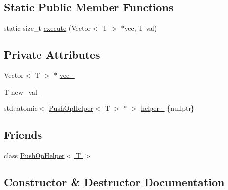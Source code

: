 \subsection*{Static Public Member Functions}
\begin{DoxyCompactItemize}
\item 
static size\+\_\+t \hyperlink{classtervel_1_1containers_1_1wf_1_1vector_1_1_push_op_adb5e668f536428dbda367da3dee6a94d}{execute} (Vector$<$ T $>$ $\ast$vec, T val)
\end{DoxyCompactItemize}
\subsection*{Private Attributes}
\begin{DoxyCompactItemize}
\item 
Vector$<$ T $>$ $\ast$ \hyperlink{classtervel_1_1containers_1_1wf_1_1vector_1_1_push_op_ace670d6d64e1f884f6213135d32d6dbe}{vec\+\_\+}
\item 
T \hyperlink{classtervel_1_1containers_1_1wf_1_1vector_1_1_push_op_a7e4e5a4d2436799e0b31bb82e0b4a0f6}{new\+\_\+val\+\_\+}
\item 
std\+::atomic$<$ \hyperlink{classtervel_1_1containers_1_1wf_1_1vector_1_1_push_op_helper}{Push\+Op\+Helper}$<$ T $>$ $\ast$ $>$ \hyperlink{classtervel_1_1containers_1_1wf_1_1vector_1_1_push_op_a285817a3099b8cda383eaf8f514d3496}{helper\+\_\+} \{nullptr\}
\end{DoxyCompactItemize}
\subsection*{Friends}
\begin{DoxyCompactItemize}
\item 
class \hyperlink{classtervel_1_1containers_1_1wf_1_1vector_1_1_push_op_a9620c687e3f69231ae07963424a2c308}{Push\+Op\+Helper$<$ T $>$}
\end{DoxyCompactItemize}


\subsection{Constructor \& Destructor Documentation}
\hypertarget{classtervel_1_1containers_1_1wf_1_1vector_1_1_push_op_a34175390fd8b79ed7f0cf9e00c0aacd6}{}
